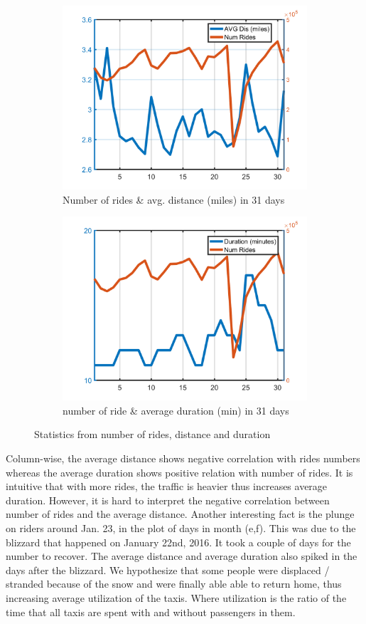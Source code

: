 \documentclass{article}
\begin{document}
\begin{figure}[H]
\begin{subfigure}{.5\linewidth}
  \centering
  \includegraphics[width=.8\linewidth]{numride_dom}
  \caption{Number of rides \& avg. distance (miles) in 31 days}
  \label{fig:sub5}
\end{subfigure}%
\begin{subfigure}{.5\linewidth}
  \centering
  \includegraphics[width=.8\linewidth]{numride_dom_dur}
  \caption{number of ride \& average duration (min) in 31 days}
  \label{fig:sub6}
\end{subfigure}

\caption{Statistics from number of rides, distance and duration}
\label{fig:ride_stats}
\end{figure}

Column-wise, the average distance shows negative correlation with rides numbers whereas the average duration shows positive relation with number of rides. It is intuitive that with more rides, the traffic is heavier thus increases average duration. However, it is hard to interpret the negative correlation between number of rides and the average distance. Another interesting fact is the plunge on riders around Jan. 23, in the plot of days in month (e,f). This was due to the blizzard that happened on January 22nd, 2016. It took a couple of days for the number to recover. The average distance and average duration also spiked in the days after the blizzard. We hypothesize that some people were displaced / stranded because of the snow and were finally able able to return home, thus increasing average utilization of the taxis. Where utilization is the ratio of the time that all taxis are spent with and without passengers in them. 
\end{document}

